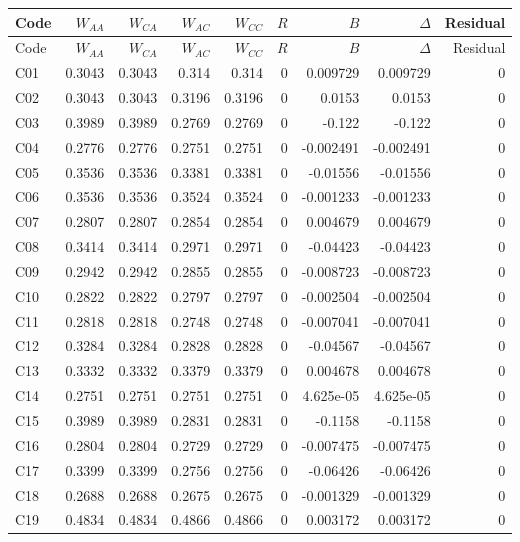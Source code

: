 \documentclass[10pt]{article}
\begin{document}
\small\setlength{\tabcolsep}{6pt}\begin{longtable}{@{}lrrrrrrrr@{}}
\toprule Code & $W_{AA}$ & $W_{CA}$ & $W_{AC}$ & $W_{CC}$ & $R$ & $B$ & $\Delta$ & Residual\\\midrule\endfirsthead
\toprule Code & $W_{AA}$ & $W_{CA}$ & $W_{AC}$ & $W_{CC}$ & $R$ & $B$ & $\Delta$ & Residual\\\midrule\endhead\bottomrule\endfoot
C01 & 0.3043 & 0.3043 & 0.314 & 0.314 & 0 & 0.009729 & 0.009729 & 0\\[1pt]
C02 & 0.3043 & 0.3043 & 0.3196 & 0.3196 & 0 & 0.0153 & 0.0153 & 0\\[1pt]
C03 & 0.3989 & 0.3989 & 0.2769 & 0.2769 & 0 & -0.122 & -0.122 & 0\\[1pt]
C04 & 0.2776 & 0.2776 & 0.2751 & 0.2751 & 0 & -0.002491 & -0.002491 & 0\\[1pt]
C05 & 0.3536 & 0.3536 & 0.3381 & 0.3381 & 0 & -0.01556 & -0.01556 & 0\\[1pt]
C06 & 0.3536 & 0.3536 & 0.3524 & 0.3524 & 0 & -0.001233 & -0.001233 & 0\\[1pt]
C07 & 0.2807 & 0.2807 & 0.2854 & 0.2854 & 0 & 0.004679 & 0.004679 & 0\\[1pt]
C08 & 0.3414 & 0.3414 & 0.2971 & 0.2971 & 0 & -0.04423 & -0.04423 & 0\\[1pt]
C09 & 0.2942 & 0.2942 & 0.2855 & 0.2855 & 0 & -0.008723 & -0.008723 & 0\\[1pt]
C10 & 0.2822 & 0.2822 & 0.2797 & 0.2797 & 0 & -0.002504 & -0.002504 & 0\\[1pt]
C11 & 0.2818 & 0.2818 & 0.2748 & 0.2748 & 0 & -0.007041 & -0.007041 & 0\\[1pt]
C12 & 0.3284 & 0.3284 & 0.2828 & 0.2828 & 0 & -0.04567 & -0.04567 & 0\\[1pt]
C13 & 0.3332 & 0.3332 & 0.3379 & 0.3379 & 0 & 0.004678 & 0.004678 & 0\\[1pt]
C14 & 0.2751 & 0.2751 & 0.2751 & 0.2751 & 0 & 4.625e-05 & 4.625e-05 & 0\\[1pt]
C15 & 0.3989 & 0.3989 & 0.2831 & 0.2831 & 0 & -0.1158 & -0.1158 & 0\\[1pt]
C16 & 0.2804 & 0.2804 & 0.2729 & 0.2729 & 0 & -0.007475 & -0.007475 & 0\\[1pt]
C17 & 0.3399 & 0.3399 & 0.2756 & 0.2756 & 0 & -0.06426 & -0.06426 & 0\\[1pt]
C18 & 0.2688 & 0.2688 & 0.2675 & 0.2675 & 0 & -0.001329 & -0.001329 & 0\\[1pt]
C19 & 0.4834 & 0.4834 & 0.4866 & 0.4866 & 0 & 0.003172 & 0.003172 & 0\\[1pt]

\end{longtable}
\end{document}
